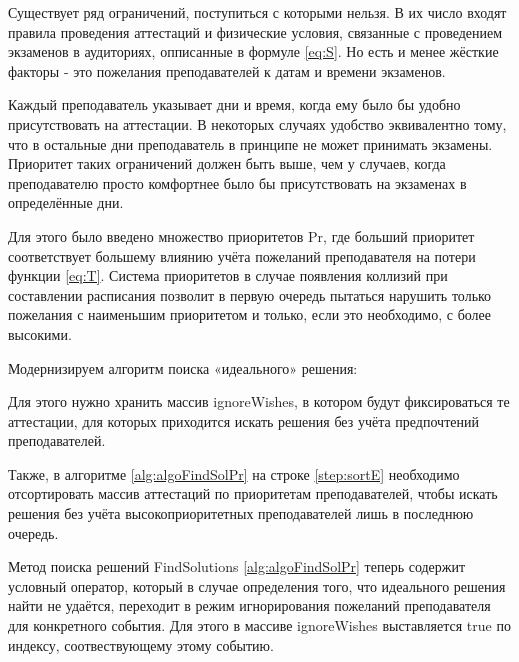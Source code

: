 Существует ряд ограничений, поступиться с которыми нельзя. В их число входят правила проведения аттестаций и физические условия, связанные с проведением экзаменов в аудиториях, опписанные в формуле \eqref{eq:S}. Но есть и менее жёсткие факторы - это пожелания преподавателей к датам и времени экзаменов. 

Каждый преподаватель указывает дни и время, когда ему было бы удобно присутствовать на аттестации. В некоторых случаях удобство эквивалентно тому, что в остальные дни преподаватель в принципе не может принимать экзамены. Приоритет таких ограничений должен быть выше, чем у случаев, когда преподавателю просто комфортнее было бы присутствовать на экзаменах в определённые дни.

Для этого было введено множество приоритетов Pr, где больший приоритет соответствует большему влиянию учёта пожеланий преподавателя на потери функции \eqref{eq:T}. Система приоритетов в случае появления коллизий при составлении расписания позволит в первую очередь пытаться нарушить только пожелания с наименьшим приоритетом и только, если это необходимо, с более высокими.

Модернизируем алгоритм поиска «идеального» решения:

Для этого нужно хранить массив ignoreWishes, в котором будут фиксироваться те аттестации, для которых приходится искать решения без учёта предпочтений преподавателей.

Также, в алгоритме \ref{alg:algoFindSolPr} на строке \ref{step:sortE} необходимо отсортировать массив аттестаций по приоритетам преподавателей, чтобы искать решения без учёта высокоприоритетных преподавателей лишь в последнюю очередь. 

Метод поиска решений FindSolutions \ref{alg:algoFindSolPr} теперь содержит условный оператор, который в случае определения того, что идеального решения найти не удаётся, переходит в режим игнорирования пожеланий преподавателя для конкретного события. Для этого в массиве ignoreWishes выставляется true по индексу, соотвествующему этому событию.

